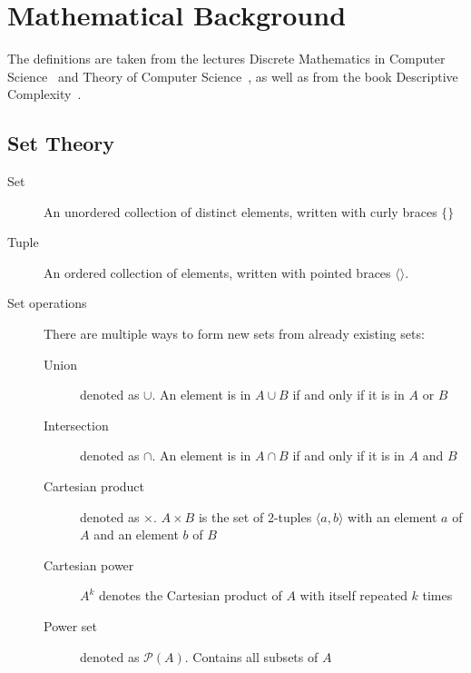 \chapter{Mathematical Background}\label{ch:mathematical-background}

The definitions are taken from the lectures Discrete Mathematics in Computer Science~\cite{discrete-maths} and Theory of Computer Science~\cite{theory-cs}, as well as from the book Descriptive Complexity~\cite{descriptive-complexity}.


\section{Set Theory}\label{sec:set-theory}
\begin{description}
    \item[Set] An unordered collection of distinct elements, written with curly braces $\{\}$
    \item[Tuple] An ordered collection of elements, written with pointed braces $\langle  \rangle$.
    \item[Set operations] There are multiple ways to form new sets from already existing sets:
    \begin{description}
        \item[Union] denoted as $\cup$.
        An element is in $A \cup B$ if and only if it is in $A$ or $B$
        \item[Intersection] denoted as $\cap$.
        An element is in $A \cap B$ if and only if it is in $A$ and $B$
        \item[Cartesian product] denoted as $\times$. $A \times B$ is the set of 2-tuples $\langle a, b\rangle$ with an element $a$ of $A$ and an element $b$ of $B$
        \item[Cartesian power] $A^k$ denotes the Cartesian product of $A$ with itself repeated $k$ times
        \item[Power set] denoted as $\mathcal{P}(A)$.
        Contains all subsets of $A$
    \end{description}
\end{description}


